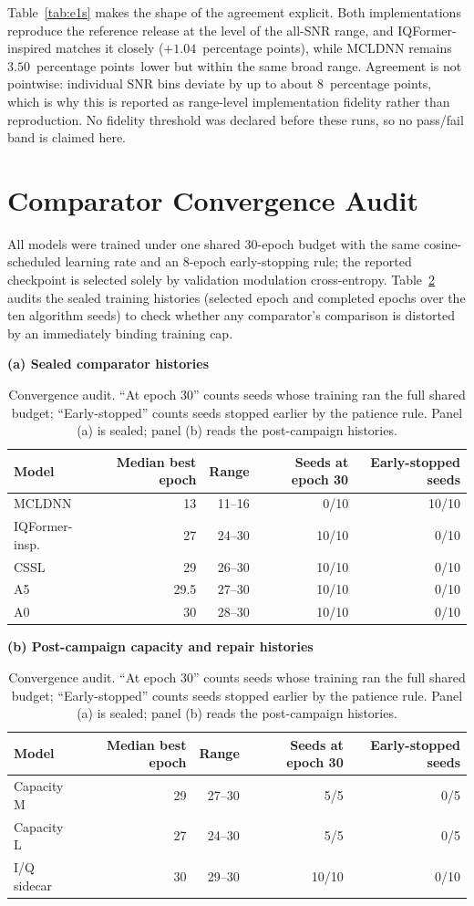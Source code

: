 \documentclass[letterpaper,onecolumn,11pt,journal]{IEEEtran}
\newcommand{\pp}{percentage points}
\begin{document}
Table~\ref{tab:e1s} makes the shape of the agreement explicit. Both
implementations reproduce the reference release at the level of the all-SNR
range, and IQFormer-inspired matches it closely ($+1.04$~\pp), while MCLDNN
remains $3.50$~\pp\ lower but within the same broad range. Agreement is not
pointwise: individual SNR bins deviate by up to about $8$~\pp, which is why
this is reported as range-level implementation fidelity rather than
reproduction. No fidelity threshold was declared before these runs, so no
pass/fail band is claimed here.

\section{Comparator Convergence Audit}
All models were trained under one shared 30-epoch budget with the same
cosine-scheduled learning rate and an 8-epoch early-stopping rule; the
reported checkpoint is selected solely by validation modulation
cross-entropy. Table~\ref{tab:convergence} audits the sealed training
histories (selected epoch and completed epochs over the ten algorithm seeds)
to check whether any comparator's comparison is distorted by an immediately
binding training cap.

\begin{table}[t]
\centering
\caption{Convergence audit. ``At epoch 30'' counts seeds whose training ran the
full shared budget; ``Early-stopped'' counts seeds stopped earlier by the
patience rule. Panel (a) is sealed; panel (b) reads the post-campaign histories.}
\label{tab:convergence}
\footnotesize
\setlength{\tabcolsep}{5pt}
\textbf{(a) Sealed comparator histories}\\[2pt]
\begin{tabular}{lrrrr}
\toprule
Model & Median best epoch & Range & Seeds at epoch 30 & Early-stopped seeds\\
\midrule
MCLDNN & 13 & 11--16 & 0/10 & 10/10\\
IQFormer-insp. & 27 & 24--30 & 10/10 & 0/10\\
CSSL & 29 & 26--30 & 10/10 & 0/10\\
A5 & 29.5 & 27--30 & 10/10 & 0/10\\
A0 & 30 & 28--30 & 10/10 & 0/10\\
\bottomrule
\end{tabular}

\vspace{5pt}
\textbf{(b) Post-campaign capacity and repair histories}\\[2pt]
\begin{tabular}{lrrrr}
\toprule
Model & Median best epoch & Range & Seeds at epoch 30 & Early-stopped seeds\\
\midrule
Capacity M & 29 & 27--30 & 5/5 & 0/5\\
Capacity L & 27 & 24--30 & 5/5 & 0/5\\
I/Q sidecar & 30 & 29--30 & 10/10 & 0/10\\
\bottomrule
\end{tabular}
\end{table}
\end{document}

